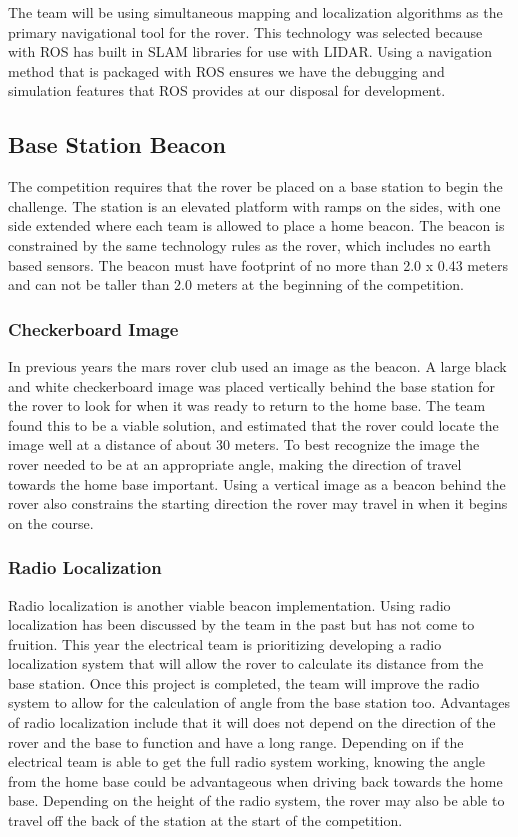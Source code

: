 \documentclass[10pt, oneside,onecolumn]{IEEEtran}
\begin{document}
\begin{titlepage}
	The team will be using simultaneous mapping and localization algorithms as the primary navigational tool for the rover. This technology was selected because with ROS has built in SLAM libraries for use with LIDAR. Using a navigation method that is packaged with ROS ensures we have the debugging and simulation features that ROS provides at our disposal for development.

\subsection{Base Station Beacon}

	The competition requires that the rover be placed on a base station to begin the challenge. The station is an elevated platform with ramps on the sides, with one side extended  where each team is allowed to place a home beacon. The beacon is constrained by the same technology rules as the rover, which includes no earth based sensors. The beacon must have footprint of no more than 2.0 x 0.43 meters and can not be taller than 2.0 meters at the beginning of the competition. 

\subsubsection{Checkerboard Image}

	In previous years the mars rover club used an image as the beacon. A large black and white checkerboard image was placed vertically behind the base station for the rover to look for when it was ready to return to the home base. The team found this to be a viable solution, and estimated that the rover could locate the image well at a distance of about 30 meters. To best recognize the image the rover needed to be at an appropriate angle, making the direction of travel towards the home base important. Using a vertical image as a beacon behind the rover also constrains the starting direction the rover may travel in when it begins on the course.

\subsubsection{Radio Localization}

	Radio localization is another viable beacon implementation. Using radio localization has been discussed by the team in the past but has not come to fruition. This year the electrical team is prioritizing developing a radio localization system that will allow the rover to calculate its distance from the base station. Once this project is completed, the team will improve the radio system to allow for the calculation of angle from the base station too. Advantages of radio localization include that it will does not depend on the direction of the rover and the base to function and have a long range. Depending on if the electrical team is able to get the full radio system working, knowing the angle from the home base could be advantageous when driving back towards the home base. Depending on the height of the radio system, the rover may also be able to travel off the back of the station at the start of the competition. 


\end{titlepage}
\end{document}
